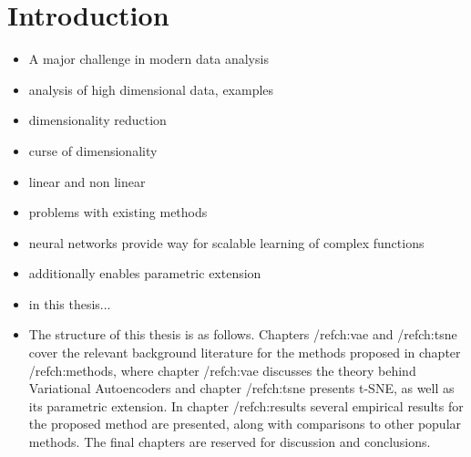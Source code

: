 \chapter{Introduction}
\label{ch:introduction}

\begin{itemize}
\item A major challenge in modern data analysis 
\item analysis of high dimensional data, examples
\item dimensionality reduction
\item curse of dimensionality
\item linear and non linear
\item problems with existing methods
\item neural networks provide way for scalable learning of complex functions
\item additionally enables parametric extension
\item in this thesis...
\item The structure of this thesis is as follows. Chapters /ref{ch:vae} and /ref{ch:tsne} cover the relevant background literature for the methods proposed in chapter /ref{ch:methods}, where chapter /ref{ch:vae} discusses the theory behind Variational Autoencoders and chapter /ref{ch:tsne} presents t-SNE, as well as its parametric extension. In chapter /ref{ch:results} several empirical results for the proposed method are presented, along with comparisons to other popular methods. The final chapters are reserved for discussion and conclusions.
\end{itemize}

